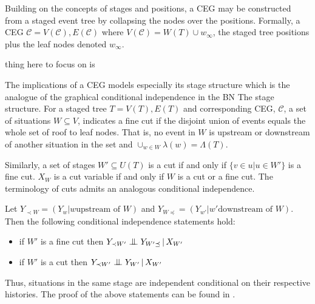 \documentclass[12pt]{article}
\newcommand{\bigCI}{\mathrel{\text{\scalebox{1.07}{$\perp\mkern-10mu\perp$}}}}
\begin{document}
Building on the concepts of stages and positions, a CEG may be constructed from a staged event tree by collapsing the nodes over the positions. Formally, a CEG $\mathcal{C} = V(\mathcal{C}), E(\mathcal{C})$ where $V(\mathcal{C}) = W(T) \cup w_\infty$, the staged tree positions plus the leaf nodes denoted $w_\infty$. 

thing here to focus on is


The implications of a CEG models especially its stage structure which
is the analogue of the graphical conditional independence in the BN
\cite{Dawid 1979} \cite{Studen 2005} The stage structure. For a staged tree $T = V(T), E(T)$ and corresponding CEG, $\mathcal{C}$, a set of situations $W \subseteq V$, indicates a fine cut if the disjoint union of events equals the whole set of roof to leaf nodes. That is, no event in $W$ is upstream or downstream of another situation in the set and $\cup_{w \in W} \lambda(w) = \Lambda (T)$.

Similarly, a set of stages $W' \subseteq U(T)$ is a cut if and only if $\{ v \in u | u \in W'\} $ is a fine cut. $X_W$ is a cut variable if and only if  $W$ is a cut or a fine cut. The terminology of cuts admits an analogous conditional independence. 

Let $Y_{\prec W} = (Y_w | w \text{upstream of } W)$ and $ Y_{W\preceq} = (Y_{w'}  | w' \text{downstream of } W) $. Then the following conditional independence statements hold:  

\begin{itemize}
	\item if $W'$ is a fine cut then $Y_{\prec W'} \bigCI Y_{W'\preceq} \,|\, X_{W'}$ 
	\item if $W'$ is a cut then $Y_{\prec W'} \bigCI Y_{W'} \,|\, X_{W'}$ 
\end{itemize}

Thus, situations in the same stage are independent conditional on their respective histories. The proof of the above statements can be found in \cite{SmithAnderson} \cite{ThwaitesSmith}.


  
\end{document}
